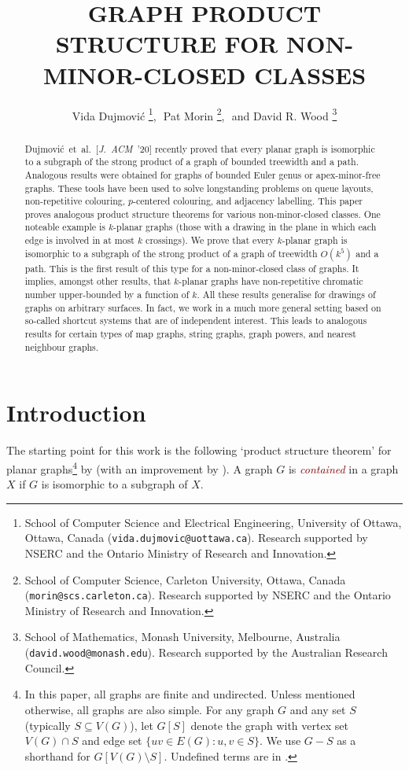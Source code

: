 \documentclass{patmorin}
\title{\MakeUppercase{Graph Product Structure for Non-Minor-Closed Classes}}
\author{%
Vida Dujmovi\'c%
\thanks{School of Computer Science and Electrical Engineering, University of Ottawa, Ottawa, Canada (\texttt{vida.dujmovic@uottawa.ca}). Research supported by NSERC and the Ontario Ministry of Research and Innovation.},\,\,
Pat Morin%
\thanks{School of Computer Science, Carleton University, Ottawa, Canada (\texttt{morin@scs.carleton.ca}). Research  supported by NSERC and the Ontario Ministry of Research and Innovation.},\,\, and
David R. Wood%
\thanks{School of Mathematics, Monash University, Melbourne, Australia (\texttt{david.wood@monash.edu}). Research supported by the Australian Research Council.}
}
\theoremstyle{plain}
\theoremstyle{definition}
\newcommand{\defin}[1]{\textcolor{Maroon}{\emph{#1}}}
\newcommand{\note}[2]{\noindent{\color{red}[#1:~#2]}}
\begin{document}
\begin{titlepage}
\maketitle

\begin{abstract}
Dujmovi\'c~et~al.~[\emph{J.~ACM}~'20] recently proved that every planar graph is isomorphic to a subgraph of the strong product of a graph of bounded treewidth and a path. Analogous results were obtained for graphs of bounded Euler genus or apex-minor-free graphs. These tools have been used to solve longstanding problems on queue layouts, non-repetitive colouring, $p$-centered colouring, and adjacency labelling. This paper proves analogous product structure theorems for various non-minor-closed classes. One noteable example is $k$-planar graphs (those with a drawing in the plane in which each edge is involved in at most $k$ crossings). We prove that every $k$-planar graph is isomorphic to a subgraph of the strong product of a graph of treewidth $O(k^5)$ and a path. This is the first result of this type for a non-minor-closed class of graphs. It implies, amongst other results, that $k$-planar graphs have non-repetitive chromatic number upper-bounded by a function of $k$. All these results generalise for drawings of graphs on arbitrary surfaces. In fact, we work in a much more general setting based on so-called shortcut systems that are of independent interest. This leads to analogous results for certain types of map graphs, string graphs, graph powers, and nearest neighbour graphs.
\end{abstract}
\end{titlepage}
\tableofcontents
\newpage

\section{Introduction}
\label{Introduction}


The starting point for this work is the following `product structure theorem' for planar graphs\footnote{In this paper, all graphs are finite and undirected. Unless mentioned otherwise, all graphs are also simple. For any graph $G$ and any set $S$ (typically $S\subseteq V(G)$), let $G[S]$  denote the graph with vertex set $V(G)\cap S$ and edge set $\{uv\in E(G) : u,v\in S\}$.  We use $G-S$ as a shorthand for $G[V(G)\setminus S]$. Undefined terms are in \citep{Diestel5}.} by \citet{DJMMUW20} (with an improvement by \citet{UWY}). A graph $G$ is \defin{contained} in a graph $X$ if $G$ is isomorphic to a subgraph of $X$.
\end{document}
